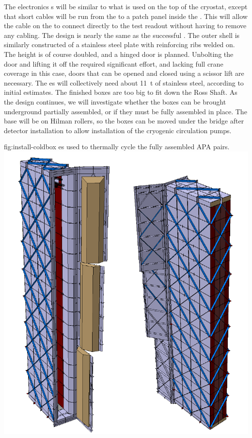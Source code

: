  
The \coldbox electronics \fdth{}s  will be  similar to what is used on the top of the  cryostat, except that short cables will be run from the   to a patch panel inside the \coldbox. This will allow the cable on the  to connect directly to the test readout without having to remove any cabling. The \coldbox  design is nearly the same as the successful  \coldbox. The outer shell is similarly constructed of a stainless steel plate with reinforcing ribs welded on. The height is of course doubled, and a hinged door is planned. Unbolting the door and lifting it off the  \coldbox required significant effort, and lacking full crane coverage in this case, doors that can be opened and closed using a scissor lift are necessary. The  \coldbox{}es will collectively need about \SI{11}{t} of stainless steel, according to initial estimates. The finished boxes are too big to fit down the Ross Shaft. As the design continues, %
we will investigate whether the boxes can be brought underground partially assembled, or if they must be fully assembled in place.  
The \coldbox base will be on Hilman rollers, so the boxes can be moved under the bridge after detector installation to allow installation of the cryogenic circulation pumps.

\begin{dunefigure}{fig:install-coldbox}
  {\coldbox{}es used to thermally cycle the fully assembled APA pairs. }
\includegraphics[width=.5\textwidth]{graphics/install-coldbox.pdf}
\end{dunefigure}




\clearpage 

